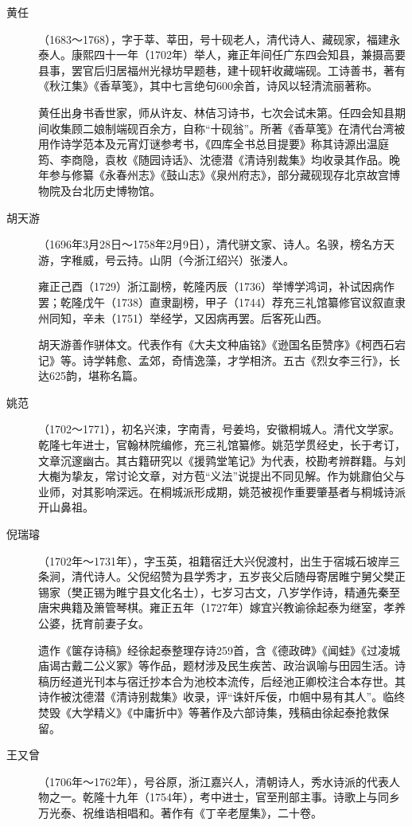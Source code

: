 \begin{description}
  \item[黄任] （1683～1768），字于莘、莘田，号十砚老人，清代诗人、藏砚家，福建永泰人。康熙四十一年（1702年）举人，雍正年间任广东四会知县，兼摄高要县事，罢官后归居福州光禄坊早题巷，建十砚轩收藏端砚。工诗善书，著有《秋江集》《香草笺》，其中七言绝句600余首，诗风以轻清流丽著称。\par
        黄任出身书香世家，师从许友、林佶习诗书，七次会试未第。任四会知县期间收集顾二娘制端砚百余方，自称“十砚翁”。所著《香草笺》在清代台湾被用作诗学范本及元宵灯谜参考书，《四库全书总目提要》称其诗源出温庭筠、李商隐，袁枚《随园诗话》、沈德潜《清诗别裁集》均收录其作品。晚年参与修纂《永春州志》《鼓山志》《泉州府志》，部分藏砚现存北京故宫博物院及台北历史博物馆。
  \item[胡天游] （1696年3月28日～1758年2月9日），清代骈文家、诗人。名骙，榜名方天游，字稚威，号云持。山阴（今浙江绍兴）张溇人。\par
        雍正己酉（1729）浙江副榜，乾隆丙辰（1736）举博学鸿词，补试因病作罢；乾隆戊午（1738）直隶副榜，甲子（1744）荐充三礼馆纂修官议叙直隶州同知，辛未（1751）举经学，又因病再罢。后客死山西。\par
        胡天游善作骈体文。代表作有《大夫文种庙铭》《逊国名臣赞序》《柯西石宕记》等。诗学韩愈、孟郊，奇情逸藻，才学相济。五古《烈女李三行》，长达625韵，堪称名篇。
  \item[姚范] （1702～1771），初名兴涑，字南青，号姜坞，安徽桐城人。清代文学家。乾隆七年进士，官翰林院编修，充三礼馆纂修。姚范学贯经史，长于考订，文章沉邃幽古。其古籍研究以《援鹑堂笔记》为代表，校勘考辨群籍。与刘大櫆为挚友，常讨论文章，对方苞“义法”说提出不同见解。作为姚鼐伯父与业师，对其影响深远。在桐城派形成期，姚范被视作重要肇基者与桐城诗派开山鼻祖。
  \item[倪瑞璿] （1702年～1731年），字玉英，祖籍宿迁大兴倪渡村，出生于宿城石坡岸三条涧，清代诗人。父倪绍赞为县学秀才，五岁丧父后随母寄居睢宁舅父樊正锡家（樊正锡为睢宁县文化名士），七岁习古文，八岁学作诗，精通先秦至唐宋典籍及箫管琴棋。雍正五年（1727年）嫁宜兴教谕徐起泰为继室，孝养公婆，抚育前妻子女。\par
        遗作《箧存诗稿》经徐起泰整理存诗259首，含《德政碑》《闻蛙》《过凌城庙谒古戴二公义冢》等作品，题材涉及民生疾苦、政治讽喻与田园生活。诗稿历经道光刊本与宿迁抄本合为池校本流传，后经池正卿校注合本存世。其诗作被沈德潜《清诗别裁集》收录，评“诛奸斥佞，巾帼中易有其人”。临终焚毁《大学精义》《中庸折中》等著作及六部诗集，残稿由徐起泰抢救保留。
  \item[王又曾] （1706年～1762年），号谷原，浙江嘉兴人，清朝诗人，秀水诗派的代表人物之一。乾隆十九年（1754年），考中进士，官至刑部主事。诗歌上与同乡万光泰、祝维诰相唱和。著作有《丁辛老屋集》，二十卷。

\end{description}
